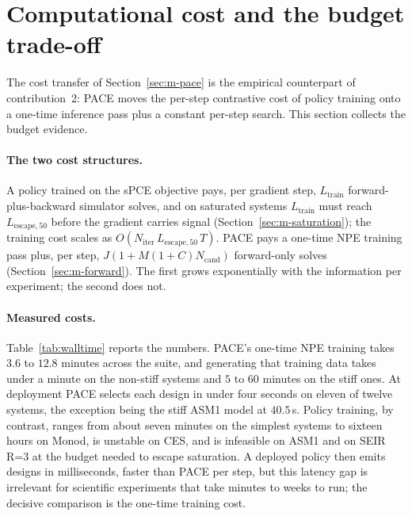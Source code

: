 \section{Computational cost and the budget trade-off}
\label{sec:r-budget}

The cost transfer of Section~\ref{sec:m-pace} is the empirical counterpart of
contribution~2: PACE moves the per-step contrastive cost of policy training onto a
one-time inference pass plus a constant per-step search. This section collects the
budget evidence.

\paragraph{The two cost structures.} A policy trained on the sPCE objective pays, per
gradient step, $L_{\mathrm{train}}$ forward-plus-backward simulator solves, and on
saturated systems $L_{\mathrm{train}}$ must reach $L_{\mathrm{escape},50}$ before the
gradient carries signal (Section~\ref{sec:m-saturation}); the training cost scales as
$O(N_{\mathrm{iter}}\,L_{\mathrm{escape},50}\,T)$. PACE pays a one-time NPE training pass
plus, per step, $J(1+M(1+C)N_{\mathrm{cand}})$ forward-only solves
(Section~\ref{sec:m-forward}). The first grows exponentially with the information per
experiment; the second does not.

\paragraph{Measured costs.} Table~\ref{tab:walltime} reports the numbers. PACE's one-time
NPE training takes $3.6$ to $12.8$ minutes across the suite, and generating that training
data takes under a minute on the non-stiff systems and $5$ to $60$ minutes on the stiff
ones. At deployment PACE selects each design in under four seconds on eleven of twelve
systems, the exception being the stiff ASM1 model at $40.5$\,s. Policy training, by
contrast, ranges from about seven minutes on the simplest systems to sixteen hours on
Monod, is unstable on CES, and is infeasible on ASM1 and on SEIR R=3 at the budget needed
to escape saturation. A deployed policy then emits designs in milliseconds, faster than
PACE per step, but this latency gap is irrelevant for scientific experiments that take
minutes to weeks to run; the decisive comparison is the one-time training cost.

